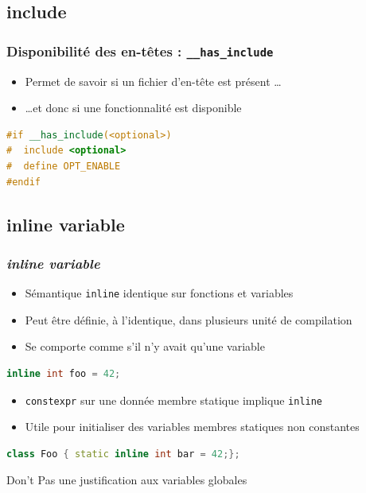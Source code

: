 \documentclass[C++.tex]{subfiles}
\begin{document}
\subsection*{include}
\begin{frame}[fragile]
	\frametitle{Disponibilité des en-têtes : \lstinline|__has_include|}
	\begin{itemize}
		\item Permet de savoir si un fichier d'en-tête est présent \ldots
		\item \ldots{}et donc si une fonctionnalité est disponible
	\end{itemize}

	\begin{lstlisting}[language=C++]
#if __has_include(<optional>)
#  include <optional>
#  define OPT_ENABLE
#endif\end{lstlisting}
\end{frame}

\subsection*{inline variable}
\begin{frame}[fragile]
	\frametitle{\textit{inline variable}}
	\begin{itemize}
		\item Sémantique \lstinline|inline| identique sur fonctions et variables
		\item Peut être définie, à l'identique, dans plusieurs unité de compilation
		\item Se comporte comme s'il n'y avait qu'une variable
	\end{itemize}

	\begin{lstlisting}[language=C++]
inline int foo = 42;\end{lstlisting}

	\begin{itemize}
		\item \lstinline|constexpr| sur une donnée membre statique implique \lstinline|inline|
		\item Utile pour initialiser des variables membres statiques non constantes
	\end{itemize}

	\begin{lstlisting}[language=C++]
class Foo { static inline int bar = 42;};\end{lstlisting}

	\begin{alertblock}{Don't}
		Pas une justification aux variables globales
	\end{alertblock}
\end{frame}
\end{document}
